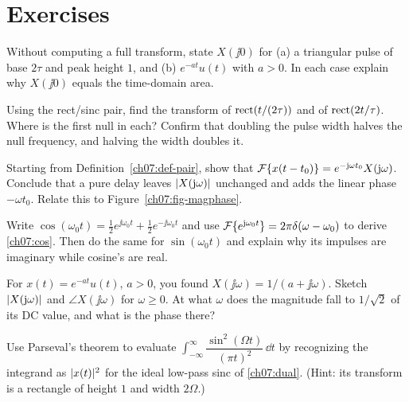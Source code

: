 \section{Exercises}
\label{ch07:exercises}

\begin{exercise}
\label{ch07:ex-dc}
Without computing a full transform, state $X(\jj 0)$ for (a) a triangular pulse of base
$2\tau$ and peak height $1$, and (b) $e^{-at}u(t)$ with $a>0$. In each case explain why
$X(\jj 0)$ equals the time-domain area.
\end{exercise}

\begin{exercise}
\label{ch07:ex-scale}
Using the rect/sinc pair, find the transform of $\operatorname{rect}(t/(2\tau))$ and of
$\operatorname{rect}(2t/\tau)$. Where is the first null in each? Confirm that doubling the pulse width
halves the null frequency, and halving the width doubles it.
\end{exercise}

\begin{exercise}
\label{ch07:ex-shift}
Starting from Definition~\ref{ch07:def-pair}, show that
$\mathcal{F}\{x(t-t_0)\} = e^{-\mathrm{j}\omega t_0}X(\mathrm{j}\omega)$. Conclude that a pure delay leaves
$\lvert X(\mathrm{j}\omega)\rvert$ unchanged and adds the linear phase $-\omega t_0$. Relate this to
Figure~\ref{ch07:fig-magphase}.
\end{exercise}

\begin{exercise}
\label{ch07:ex-cos}
Write $\cos(\omega_0 t) = \tfrac12 e^{\jj\omega_0 t} + \tfrac12 e^{-\jj\omega_0 t}$ and use
$\mathcal{F}\{e^{\mathrm{j}\omega_0 t}\}=2\pi\delta(\omega-\omega_0)$ to derive \eqref{ch07:cos}. Then do
the same for $\sin(\omega_0 t)$ and explain why its impulses are imaginary while cosine's
are real.
\end{exercise}

\begin{exercise}
\label{ch07:ex-exp}
For $x(t) = e^{-at}u(t)$, $a>0$, you found $X(\jj\omega) = 1/(a+\jj\omega)$. Sketch
$\lvert X(\mathrm{j}\omega)\rvert$ and $\angle X(\jj\omega)$ for $\omega\ge 0$. At what $\omega$ does
the magnitude fall to $1/\sqrt2$ of its DC value, and what is the phase there?
\end{exercise}

\begin{exercise}
\label{ch07:ex-parseval2}
Use Parseval's theorem to evaluate $\int_{-\infty}^{\infty}\dfrac{\sin^2(\Omega t)}{(\pi t)^2}\,\dd t$
by recognizing the integrand as $\lvert x(t)\rvert^2$ for the ideal low-pass sinc of
\eqref{ch07:dual}. (Hint: its transform is a rectangle of height $1$ and width $2\Omega$.)
\end{exercise}

